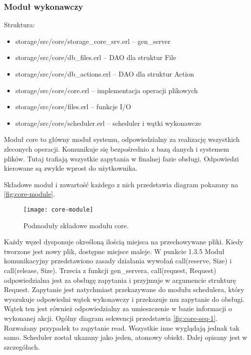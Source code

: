 \subsubsection{Moduł wykonawczy}
Struktura:
\begin{itemize}
	\item storage/src/core/storage\_core\_srv.erl – gen\_server
\item storage/src/core/db\_files.erl – DAO dla struktur File
\item storage/src/core/db\_actions.erl – DAO dla struktur Action
\item storage/src/core/core.erl – implementacja operacji plikowych
\item storage/src/core/files.erl – funkcje I/O
\item storage/src/core/scheduler.erl – scheduler i wątki wykonawcze
\end{itemize}

Moduł core to główny moduł systemu, odpowiedzialny za realizację wszystkich zleconych operacji. Komunikuje się bezpośrednio z bazą danych i systemem plików. Tutaj trafiają wszystkie zapytania w finalnej fazie obsługi. Odpowiedzi kierowane są zwykle wprost do użytkownika.

Składowe moduł i zawartość każdego z nich przedstawia diagram pokazany na \autoref{fig:core-module}.

\begin{figure}[!htbp]
	\centering
	\texttt{[image: core-module]}
	\caption[Struktura modułu wykonawczego.]{Podmoduły składowe modułu core.}
	\label{fig:core-module}
\end{figure}

Każdy węzeł dysponuje określoną ilością miejsca na przechowywane pliki. Kiedy tworzone jest nowy plik, dostępne miejsce maleje. W punkcie 1.3.5 Moduł komunikacyjny przedstawiono zasady działania wywołań call(reserve, Size) i call(release, Size). Trzecia z funkcji gen\_servera, call(request, Request) odpowiedzialna jest za obsługę zapytania i przyjmuje w argumencie strukturę Request.
Zapytanie jest natychmiast przekazywane do modułu schedulera, który wyszukuje odpowiedni wątek wykonawczy i przekazuje mu zapytanie do obsługi. Wątek ten jest również odpowiedzialny za umieszczenie w bazie informacji o wykonanej akcji.
Ogólny diagram sekwencji przedstawia \autoref{fig:core-seq-1}. Rozważany przypadek to zapytanie read. Wszystkie inne wyglądają jednak tak samo. Scheduler został ukazany jako jeden, atomowy obiekt. Dalej opisany jest w szczegółach.

